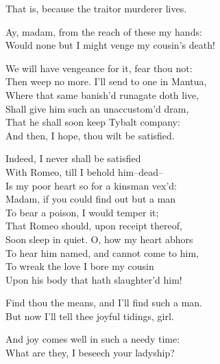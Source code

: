 \begin{speech}
That is, because the traitor murderer lives. \\

\end{speech}
\begin{speech}
Ay, madam, from the reach of these my hands: \\
Would none but I might venge my cousin's death! \\
\end{speech}
\begin{speech}
We will have vengeance for it, fear thou not:
\\
Then weep no more.   I'll send to one in Mantua, \\
Where that same banish'd runagate doth live, \\
Shall give him such an unaccustom'd dram, \\
That he shall soon keep Tybalt company: \\
And then, I hope, thou wilt be satisfied. \\
\end{speech}
\begin{speech}
Indeed, I never shall be satisfied \\
With Romeo, till I behold him--dead-- \\
Is my poor heart so for a kinsman vex'd: \\
Madam, if you could find out but a man \\
To bear a poison, I would temper it; \\
That Romeo should, upon receipt thereof, \\
Soon sleep in quiet. O, how my heart abhors \\
To hear him named, and cannot come to him, \\
To wreak the love I bore my cousin \\
Upon his body that hath slaughter'd him! \\
\end{speech}
\begin{speech}
Find thou the means, and I'll find such a man.
\\
But now I'll tell thee joyful tidings, girl. \\
\end{speech}
\begin{speech}
And joy comes well in such a needy time: \\
What are they, I beseech your ladyship? \\
\end{speech}

